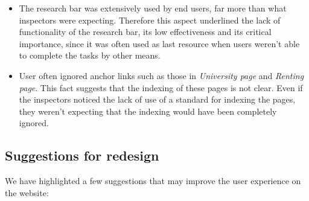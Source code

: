 \begin{itemize}
    \item The research bar was extensively used by end users, far more than what inspectors were expecting. Therefore this aspect underlined the lack of functionality of the research bar, its low effectiveness and its critical importance, since it was often used as last resource when users weren't able to complete the tasks by other means.
\end{itemize}

\begin{itemize}
    \item User often ignored anchor links such as those in \emph{University page} and \emph{Renting page}. This fact suggests that the indexing of these pages is not clear. Even if the inspectors noticed the lack of use of a standard for indexing the pages, they weren't expecting that the indexing would have been completely ignored. 
\end{itemize}



\subsection{Suggestions for redesign}

We have highlighted a few suggestions that may improve the user experience on the website:


